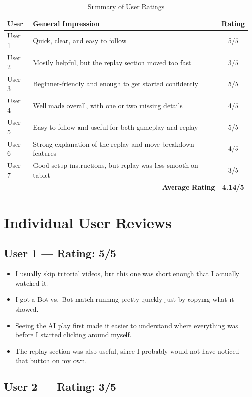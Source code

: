 \documentclass{article}
\begin{document}
\begin{table}[H]
\centering
\caption{Summary of User Ratings}
\label{tab:review-summary}
\begin{tabularx}{0.75\textwidth}{lXc}
\toprule
\textbf{User} & \textbf{General Impression} & \textbf{Rating} \\
\midrule
User 1 & Quick, clear, and easy to follow & 5/5 \\
User 2 & Mostly helpful, but the replay section moved too fast & 3/5 \\
User 3 & Beginner-friendly and enough to get started confidently & 5/5 \\
User 4 & Well made overall, with one or two missing details & 4/5 \\
User 5 & Easy to follow and useful for both gameplay and replay & 5/5 \\
User 6 & Strong explanation of the replay and move-breakdown features & 4/5 \\
User 7 & Good setup instructions, but replay was less smooth on tablet & 3/5 \\
\midrule
\multicolumn{2}{r}{\textbf{Average Rating}} & \textbf{4.14/5} \\
\bottomrule
\end{tabularx}
\end{table}

\section{Individual User Reviews}

\subsection{User 1 --- Rating: 5/5}

\begin{itemize}
    \item I usually skip tutorial videos, but this one was short enough that I actually watched it.
    \item I got a Bot vs.\ Bot match running pretty quickly just by copying what it showed.
    \item Seeing the AI play first made it easier to understand where everything was before I started clicking around myself.
    \item The replay section was also useful, since I probably would not have noticed that button on my own.
\end{itemize}

\subsection{User 2 --- Rating: 3/5}
\end{document}

